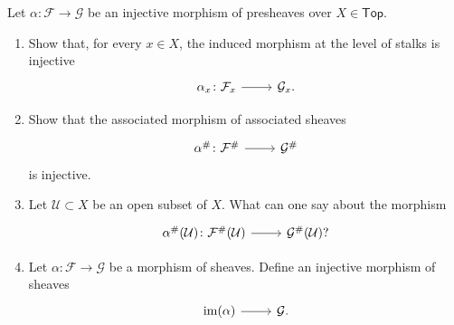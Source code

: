 \documentclass[../Main]{subfiles}
\begin{document}
\begin{exr}
	Let $\alpha\colon \mathcal{F} \to \mathcal{G}$ be an injective morphism of presheaves
	over $X \in \mathsf{Top}$.
	\begin{enumerate}
		\item Show that, for every $x \in X$, the induced morphism at
			the level of stalks is injective
			\begin{equation}
				\begin{tikzcd}
					\alpha_x\colon \mathcal{F}_x \arrow[r, "", rightarrow] &
				\mathcal{G}_x.
				\end{tikzcd}
			\end{equation} 
		\item Show that the associated morphism of associated sheaves
			\begin{equation}
				\begin{tikzcd}
					\alpha^\#\colon \mathcal{F}^\# \arrow[r, "", rightarrow] &
			\mathcal{G}^\#
				\end{tikzcd}
			\end{equation} 
			is injective.
		\item Let $\mathcal{U} \subset X$ be an open subset of $X$.
			What can one say about the morphism
			\begin{equation}
				\begin{tikzcd}
					\alpha^\#(\mathcal{U})\colon \mathcal{F}^\#(\mathcal{U}) \arrow[r, "", rightarrow] &
				\mathcal{G}^\#(\mathcal{U})?
				\end{tikzcd}
			\end{equation} 
		\item Let $\alpha\colon \mathcal{F} \to \mathcal{G}$ be a morphism of sheaves.
			Define an injective morphism of sheaves
			\begin{equation}
				\begin{tikzcd}
					\ima(\alpha) \arrow[r, "", rightarrow] &
					\mathcal{G}.
				\end{tikzcd}
			\end{equation} 
	\end{enumerate}
\end{exr} 
\end{document}
